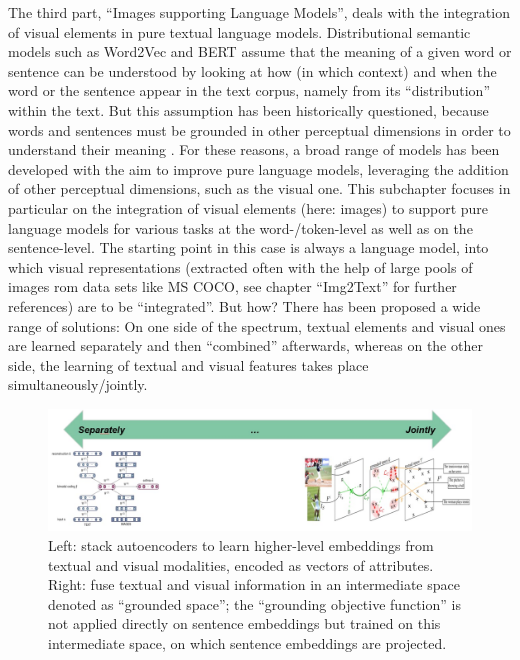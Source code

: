 \documentclass[
]{krantz}
\begin{document}
The third part, ``Images supporting Language Models'', deals with the integration of visual elements in pure textual language models.
Distributional semantic models such as Word2Vec and BERT assume that the meaning of a given word or sentence can be understood by looking at how (in which context) and when the word or the sentence appear in the text corpus, namely from its ``distribution'' within the text.
But this assumption has been historically questioned, because words and sentences must be grounded in other perceptual dimensions in order to understand their meaning \citep[see for example the ``symbol grounding problem'';][]{harnad1990symbol}.
For these reasons, a broad range of models has been developed with the aim to improve pure language models, leveraging the addition of other perceptual dimensions, such as the visual one.
This subchapter focuses in particular on the integration of visual elements (here: images) to support pure language models for various tasks at the word-/token-level as well as on the sentence-level.
The starting point in this case is always a language model, into which visual representations (extracted often with the help of large pools of images rom data sets like MS COCO, see chapter ``Img2Text'' for further references) are to be ``integrated''.
But how?
There has been proposed a wide range of solutions:
On one side of the spectrum, textual elements and visual ones are learned separately and then ``combined'' afterwards, whereas on the other side, the learning of textual and visual features takes place simultaneously/jointly.

\begin{figure}

{\centering \includegraphics[width=1\linewidth]{figures/02-chapter2/Img_Ch_Intro} 

}

\caption{Left: \citet{silberer2014learning} stack autoencoders to learn higher-level embeddings from textual and visual modalities, encoded as vectors of attributes. Right: \citet{bordes2020incorporating} fuse textual and visual information in an intermediate space denoted as ``grounded space''; the ``grounding objective function'' is not applied directly on sentence embeddings but trained on this intermediate space, on which sentence embeddings are projected.}\label{fig:f02-00-01}
\end{figure}
\end{document}
